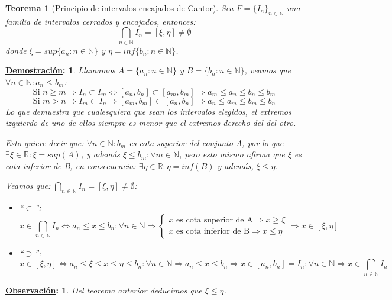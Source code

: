 \documentclass[10pt,a4paper,openright]{book}
\theoremstyle{break}
\newtheorem*{theo}{Teorema}
\newtheorem*{demo}{\underline{Demostración}:}
\newtheorem*{obs}{\underline{Observación}:}
\begin{document}
\begin{theo}[Principio de intervalos encajados de Cantor]
Sea $F=\{I_n\}_{n\in \mathbb N}$ una familia de intervalos cerrados y encajados, entonces:
$$\bigcap_{n\in \mathbb N}I_n = [\xi, \eta] \neq \emptyset$$
donde $\xi=sup\{a_n: n\in \mathbb N\}$ y $\eta=inf\{b_n: n\in \mathbb N\}$.
\end{theo}
\begin{demo}
Llamamos $A=\{a_n: n\in \mathbb N\}$ y $B=\{b_n: n\in \mathbb N\}$, veamos que $\forall n\in \mathbb N: a_n\leq b_m$:
$$\mbox{Si }n\geq m\Rightarrow I_n\subset I_m\Leftrightarrow [a_n,b_n]\subset [a_m, b_m]\Rightarrow a_m\leq a_n\leq b_n\leq b_m$$
$$\mbox{Si }m>n\Rightarrow I_m\subset I_n\Rightarrow [a_m,b_m]\subset[a_n,b_n]\Rightarrow a_n\leq a_m\leq b_m\leq b_n$$
Lo que demuestra que cualesquiera que sean los intervalos elegidos, el extremos izquierdo de uno de ellos siempre es menor que el extremos derecho del del otro.\par 
Esto quiere decir que: $\forall n\in \mathbb N: b_m$ es cota superior del conjunto A, por lo que $\exists \xi\in \mathbb R: \xi=sup (A)$, y además $\xi\leq b_m :\forall m\in \mathbb N$, pero esto mismo afirma que $\xi$ es cota inferior de B, en consecuencia: $\exists \eta\in \mathbb R: \eta=inf(B)$ y además, $\xi\leq\eta$.\par
Veamos que: $\bigcap_{n\in \mathbb N}I_n=[\xi, \eta]\neq \emptyset$:
\begin{itemize}
\item ``$\subset$'':
$$x\in \bigcap_{n\in \mathbb N}I_n\Leftrightarrow a_n\leq x\leq b_n: \forall n \in \mathbb N\Rightarrow\begin{cases} x \mbox{ es cota superior de A}\Rightarrow x\geq\xi \\
x\mbox{ es cota inferior de B}\Rightarrow x\leq \eta\end{cases}\Rightarrow x\in [\xi,\eta]$$

\item ``$\supset$'':
$$x\in [\xi,\eta]\Leftrightarrow a_n\leq \xi\leq x\leq \eta\leq b_n: \forall n \in \mathbb N\Rightarrow a_n\leq x\leq b_n\Rightarrow x\in [a_n,b_n]=I_n: \forall n\in \mathbb N\Rightarrow x\in \bigcap_{n\in \mathbb N}I_n$$
\end{itemize}
\end{demo}

\begin{obs}
Del teorema anterior deducimos que $\xi\leq \eta$.
\end{obs}
\end{document}
